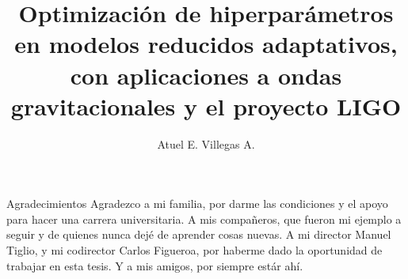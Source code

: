 \documentclass[12pt,screen,twoside,pagebackref]{ibtesis}
\title{Optimización de hiperparámetros en modelos reducidos adaptativos, con aplicaciones a ondas gravitacionales y el proyecto LIGO}
\author{Atuel E. Villegas A.}
\begin{document}

\begin{preliminary}




\tableofcontents                %





\end{preliminary}







\appendix
%

\begin{biblio}

\end{biblio}


\begin{postliminary}


\begin{seccion}{Agradecimientos}
Agradezco a mi familia, por darme las condiciones y el apoyo para hacer una carrera universitaria. 
A mis compañeros, que fueron mi ejemplo a seguir y de quienes nunca dejé de aprender cosas nuevas. 
A mi director Manuel Tiglio, y mi codirector Carlos Figueroa, por haberme dado la oportunidad de trabajar en esta tesis. 
Y a mis amigos, por siempre estár ahí. 
\end{seccion}

\end{postliminary}
\end{document}
